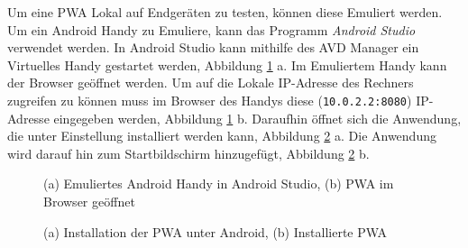 Um eine PWA Lokal auf Endgeräten zu testen, können diese Emuliert werden.           
Um ein Android Handy zu Emuliere, kann das Programm \textit{Android Studio} verwendet werden. In Android Studio kann mithilfe des \ac{AVD Manager} ein Virtuelles Handy gestartet werden, Abbildung \ref{Android1} a. Im Emuliertem Handy kann der Browser geöffnet werden. Um auf die Lokale IP-Adresse des Rechners zugreifen zu können muss im Browser des Handys diese (\texttt{10.0.2.2:8080}) IP-Adresse eingegeben werden, Abbildung \ref{Android1} b. Daraufhin öffnet sich die Anwendung, die unter Einstellung installiert werden kann, Abbildung \ref{Android2} a. Die Anwendung wird darauf hin zum Startbildschirm hinzugefügt, Abbildung \ref{Android2} b.  

\begin{figure}[!htb]
    \centering
    \qquad
    \caption{(a) Emuliertes Android Handy in Android Studio, (b) PWA im Browser geöffnet}
    \label{Android1}
\end{figure}

\begin{figure}[!htb]
    \centering
    \qquad
    \caption{(a) Installation der PWA unter Android, (b) Installierte PWA }
    \label{Android2}
\end{figure}